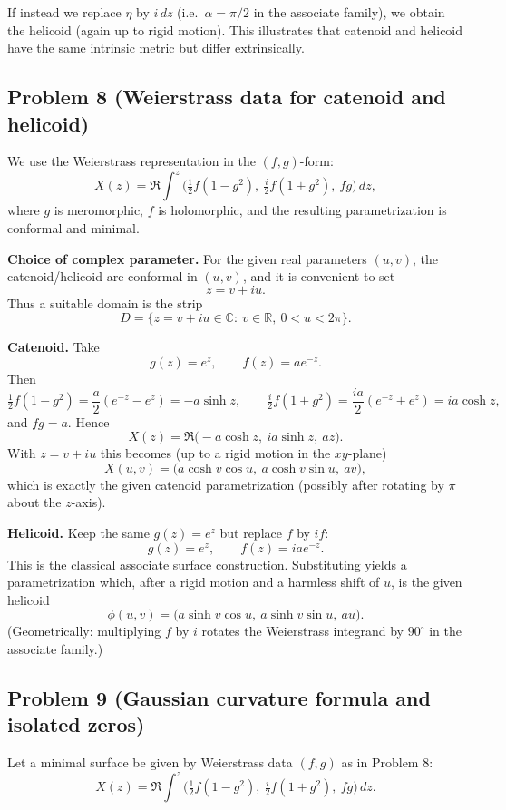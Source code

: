 \documentclass[12pt,a4paper]{article}
\theoremstyle{plain}
\theoremstyle{definition}      %
\begin{document}
	If instead we replace $\eta$ by $i\,dz$ (i.e.\ $\alpha=\pi/2$ in the associate family),
	we obtain the helicoid (again up to rigid motion). This illustrates that catenoid and helicoid have the same
	intrinsic metric but differ extrinsically.
	
	
	\subsection*{Problem 8 (Weierstrass data for catenoid and helicoid)}
	We use the Weierstrass representation in the $(f,g)$-form:
	\[
	X(z)=\Re\int^z \Big(\tfrac12 f(1-g^2),\ \tfrac{i}{2}f(1+g^2),\ fg\Big)\,dz,
	\]
	where $g$ is meromorphic, $f$ is holomorphic, and the resulting parametrization is conformal and minimal.
	
	\medskip
	\textbf{Choice of complex parameter.}
	For the given real parameters $(u,v)$, the catenoid/helicoid are conformal in $(u,v)$, and it is convenient to set
	\[
	z=v+iu.
	\]
	Thus a suitable domain is the strip
	\[
	D=\{z=v+iu\in\mathbb{C}:\ v\in\mathbb{R},\ 0<u<2\pi\}.
	\]
	
	\medskip
	\textbf{Catenoid.}
	Take
	\[
	g(z)=e^{z},\qquad f(z)=a e^{-z}.
	\]
	Then
	\[
	\tfrac12 f(1-g^2)=\frac{a}{2}(e^{-z}-e^{z})=-a\sinh z,\qquad
	\tfrac{i}{2}f(1+g^2)=\frac{ia}{2}(e^{-z}+e^{z})=i a\cosh z,
	\]
	and $fg=a$. Hence
	\[
	X(z)=\Re\bigl(-a\cosh z,\ i a\sinh z,\ a z\bigr).
	\]
	With $z=v+iu$ this becomes (up to a rigid motion in the $xy$-plane)
	\[
	X(u,v)=\bigl(a\cosh v\cos u,\ a\cosh v\sin u,\ a v\bigr),
	\]
	which is exactly the given catenoid parametrization (possibly after rotating by $\pi$ about the $z$-axis).
	
	\medskip
	\textbf{Helicoid.}
	Keep the same $g(z)=e^{z}$ but replace $f$ by $if$:
	\[
	g(z)=e^{z},\qquad f(z)= i a e^{-z}.
	\]
	This is the classical associate surface construction. Substituting yields a parametrization which, after a rigid motion
	and a harmless shift of $u$, is the given helicoid
	\[
	\phi(u,v)=\bigl(a\sinh v\cos u,\ a\sinh v\sin u,\ a u\bigr).
	\]
	(Geometrically: multiplying $f$ by $i$ rotates the Weierstrass integrand by $90^\circ$ in the associate family.)
	
	\bigskip
	\subsection*{Problem 9 (Gaussian curvature formula and isolated zeros)}
	Let a minimal surface be given by Weierstrass data $(f,g)$ as in Problem 8:
	\[
	X(z)=\Re\int^z \Big(\tfrac12 f(1-g^2),\ \tfrac{i}{2}f(1+g^2),\ fg\Big)\,dz.
	\]
	
\end{document}
